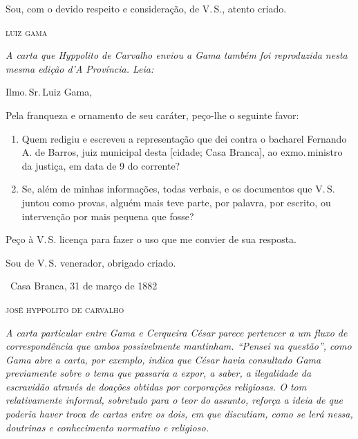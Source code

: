 {Sou, com o devido respeito e consideração, de V.\,S., atento criado.\medskip

\hfill\textsc{luiz gama}

\pagebreak
\noindent\dotfill

\begin{resumo}\itshape 
A carta que Hyppolito de Carvalho enviou a Gama também foi reproduzida
  nesta mesma edição d'\emph{A Província}. Leia:
\end{resumo}

Ilmo.\,Sr.\,Luiz Gama,

Pela franqueza e ornamento de seu caráter, peço-lhe o seguinte favor:

\begin{enumerate}[label=\arabic*º:]
\item Quem redigiu e escreveu a representação que dei contra o bacharel
Fernando A. de Barros, juiz municipal desta {[}cidade; Casa Branca{]},
ao exmo.\,ministro da justiça, em data de 9 do corrente?

\item Se, além de minhas informações, todas verbais, e os documentos que
V.\,S. juntou como provas, alguém mais teve parte, por palavra, por
escrito, ou intervenção por mais pequena que fosse?
\end{enumerate}

Peço à V.\,S. licença para fazer o uso que me convier de sua resposta.

Sou de V.\,S. venerador, obrigado criado.\medskip

\hfill\ Casa Branca, 31 de março de 1882

\hfill\textsc{josé hyppolito de carvalho}


\begin{resumo}
\emph{A carta particular entre Gama e Cerqueira César parece pertencer a
um fluxo de correspondência que ambos possivelmente mantinham. ``Pensei
na questão'', como Gama abre a carta, por exemplo, indica que César havia
consultado Gama previamente sobre o tema que passaria a expor, a saber,
a ilegalidade da escravidão através de doações obtidas por corporações
religiosas. O tom relativamente informal, sobretudo para o teor do
assunto, reforça a ideia de que poderia haver troca de cartas entre os
dois, em que discutiam, como se lerá nessa, doutrinas e conhecimento
normativo e religioso. }
\end{resumo}

}
